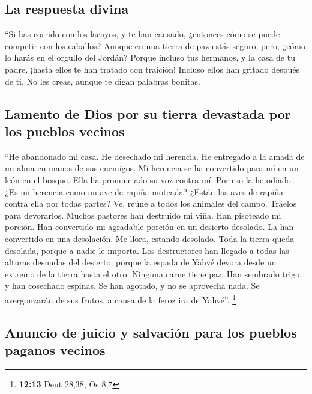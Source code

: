\hypertarget{la-respuesta-divina}{%
\subsection{La respuesta divina}\label{la-respuesta-divina}}

 ``Si has corrido con los lacayos, y te han cansado,
¿entonces cómo se puede competir con los caballos? Aunque en una tierra
de paz estás seguro, pero, ¿cómo lo harás en el orgullo del Jordán?
 Porque incluso tus hermanos, y la casa de tu padre,
¡hasta ellos te han tratado con traición! Incluso ellos han gritado
después de ti. No les creas, aunque te digan palabras bonitas.

\hypertarget{lamento-de-dios-por-su-tierra-devastada-por-los-pueblos-vecinos}{%
\subsection{Lamento de Dios por su tierra devastada por los pueblos
vecinos}\label{lamento-de-dios-por-su-tierra-devastada-por-los-pueblos-vecinos}}

 ``He abandonado mi casa. He desechado mi herencia. He
entregado a la amada de mi alma en manos de sus enemigos. 
Mi herencia se ha convertido para mí en un león en el bosque. Ella ha
pronunciado su voz contra mí. Por eso la he odiado.  ¿Es
mi herencia como un ave de rapiña moteada? ¿Están las aves de rapiña
contra ella por todas partes? Ve, reúne a todos los animales del campo.
Tráelos para devorarlos.  Muchos pastores han destruido
mi viña. Han pisoteado mi porción. Han convertido mi agradable porción
en un desierto desolado.  La han convertido en una
desolación. Me llora, estando desolado. Toda la tierra queda desolada,
porque a nadie le importa.  Los destructores han llegado
a todas las alturas desnudas del desierto; porque la espada de Yahvé
devora desde un extremo de la tierra hasta el otro. Ninguna carne tiene
paz.  Han sembrado trigo, y han cosechado espinas. Se han
agotado, y no se aprovecha nada. Se avergonzarán de sus frutos, a causa
de la feroz ira de Yahvé''. \footnote{\textbf{12:13} Deut 28,38; Os 8,7}

\hypertarget{anuncio-de-juicio-y-salvaciuxf3n-para-los-pueblos-paganos-vecinos}{%
\subsection{Anuncio de juicio y salvación para los pueblos paganos
vecinos}\label{anuncio-de-juicio-y-salvaciuxf3n-para-los-pueblos-paganos-vecinos}}

